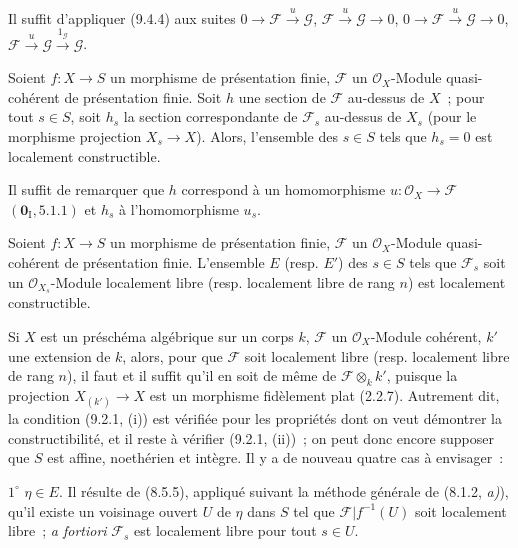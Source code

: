Il suffit d'appliquer (9.4.4) aux suites
$0\to\mathcal F\xrightarrow{u}\mathcal G$,
$\mathcal F\xrightarrow{u}\mathcal G\to0$,
$0\to\mathcal F\xrightarrow{u}\mathcal G\to0$,
$\mathcal F\xrightarrow{u}\mathcal G\xrightarrow{1_\mathcal G}\mathcal G$.

\begin{corollary}[9.4.6]
\label{IV.9.4.6-fr}
Soient $f:X\to S$ un morphisme de présentation finie, $\mathcal F$ un
$\mathcal O_X$-Module quasi-cohérent de présentation finie. Soit $h$ une
section de $\mathcal F$ au-dessus de $X$~; pour tout $s\in S$, soit $h_s$ la
section correspondante de $\mathcal F_s$ au-dessus de $X_s$ \textnormal{(}pour
le morphisme projection $X_s\to X$\textnormal{)}. Alors, l'ensemble des
$s\in S$ tels que $h_s=0$ est localement constructible.
\end{corollary}

Il suffit de remarquer que $h$ correspond à un homomorphisme
$u:\mathcal O_X\to\mathcal F$ $(\mathbf 0_{\mathrm I},5.1.1)$ et $h_s$ à
l'homomorphisme $u_s$.

\begin{proposition}[9.4.7]
\label{IV.9.4.7-fr}
Soient $f:X\to S$ un morphisme de présentation finie, $\mathcal F$ un
$\mathcal O_X$-Module quasi-cohérent de présentation finie. L'ensemble $E$
\textnormal{(}resp. $E'$\textnormal{)} des $s\in S$ tels que $\mathcal F_s$
soit un $\mathcal O_{X_s}$-Module localement libre \textnormal{(}resp.
localement libre de rang $n$\textnormal{)} est localement constructible.
\end{proposition}

Si $X$ est un préschéma algébrique sur un corps $k$, $\mathcal F$ un
$\mathcal O_X$-Module cohérent, $k'$ une extension de $k$, alors, pour que
$\mathcal F$ soit localement libre (resp. localement libre de rang $n$), il
faut et il suffit qu'il en soit de même de $\mathcal F\otimes_k k'$, puisque la
projection $X_{(k')}\to X$ est un morphisme fidèlement plat (2.2.7). Autrement
dit, la condition (9.2.1, (i)) est vérifiée pour les propriétés dont on veut
démontrer la constructibilité, et il reste à vérifier (9.2.1, (ii))~; on peut
donc encore supposer que $S$ est affine, noethérien et intègre. Il y a de
nouveau quatre cas à envisager~:

$1^\circ$ $\eta\in E$. Il résulte de (8.5.5), appliqué suivant la méthode
générale de (8.1.2, \emph{a)}), qu'il existe un voisinage ouvert $U$ de $\eta$
dans $S$ tel que $\mathcal F|f^{-1}(U)$ soit localement libre~;
\emph{a fortiori} $\mathcal F_s$ est localement libre pour tout $s\in U$.

